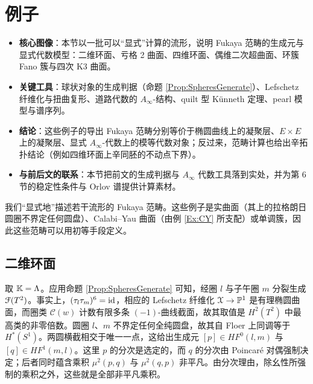 
\section{例子}\label{Sec:Examples}

\begin{keypoints}
\begin{itemize}
  \item \textbf{核心图像}：本节以一批可以“显式”计算的流形，说明 Fukaya 范畴的生成元与显式代数模型：二维环面、亏格 2 曲面、四维环面、偶维二次超曲面、环簇 Fano 簇与四次 K3 曲面。
  \item \textbf{关键工具}：球状对象的生成判据（命题 \ref{Prop:SpheresGenerate}）、Lefschetz 纤维化与扭曲复形、道路代数的 $A_{\infty}$-结构、quilt 型 Künneth 定理、pearl 模型与谱序列。
  \item \textbf{结论}：这些例子的导出 Fukaya 范畴分别等价于椭圆曲线上的凝聚层、$E\times E$ 上的凝聚层、显式 $A_{\infty}$-代数上的模等代数对象；反过来，范畴计算也给出辛拓扑结论（例如四维环面上辛同胚的不动点下界）。
  \item \textbf{与前后文的联系}：本节把前文的生成判据与 $A_\infty$ 代数工具落到实处，并为第 6 节的稳定性条件与 Orlov 谱提供计算素材。
\end{itemize}
\end{keypoints}

我们“显式地”描述若干流形的 Fukaya 范畴。这些例子是实曲面（其上的拉格朗日圆圈不界定任何圆盘）、Calabi--Yau 曲面（由例 \ref{Ex:CY} 所支配）或单调簇，因此这些范畴可以用初等手段定义。

\subsection{二维环面} 取 $\mathbb{K} = \Lambda$。应用命题 \ref{Prop:SpheresGenerate} 可知，经圈 $l$ 与子午圈 $m$ 分裂生成 $\EuScript{F}(T^2)$。事实上，$(\tau_l \tau_m)^6 = \mathrm{id}$，相应的 Lefschetz 纤维化 $\EuScript{X} \rightarrow \mathbb{P}^1$ 是有理椭圆曲面，而圈类 $\mathcal{C}(w)$ 计数有限多条 $(-1)$-曲线截面，故其取值是 $H^2(T^2)$ 中最高类的非零倍数。圆圈 $l$、$m$ 不界定任何全纯圆盘，故其自 Floer 上同调等于 $H^*(S^1)$。两圆横截相交于唯一一点，这给出生成元 $[p]\in HF^0(l,m)$ 与 $[q]\in HF^1(m,l)$。这里 $p$ 的分次是选定的，而 $q$ 的分次由 Poincaré 对偶强制决定；后者同时蕴含乘积 $\mu^2(p,q)$ 与 $\mu^2(q,p)$ 非平凡。由分次理由，除幺性所强制的乘积之外，这些就是全部非平凡乘积。


